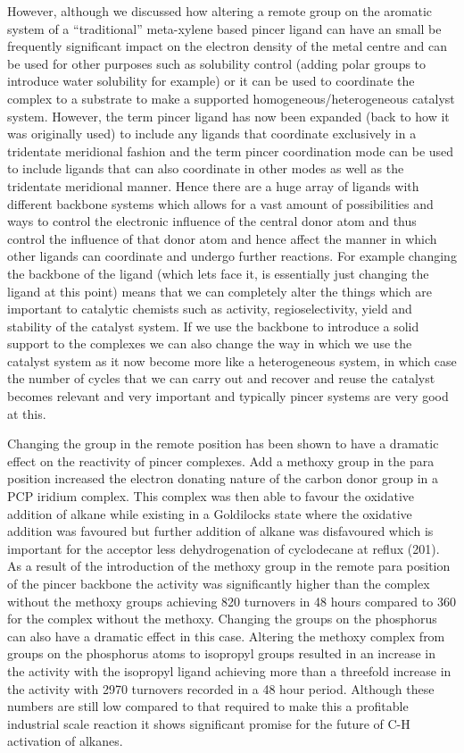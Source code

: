 However, although we discussed how altering a remote group on the aromatic system of a ``traditional'' meta-xylene based pincer ligand can have an small be frequently significant impact on the electron density of the metal centre and can be used for other purposes such as solubility control (adding polar groups to introduce water solubility for example) or it can be used to coordinate the complex to a substrate to make a supported homogeneous/heterogeneous catalyst system.  However, the term pincer ligand has now been expanded (back to how it was originally used) to include any ligands that coordinate exclusively in a tridentate meridional fashion and the term pincer coordination mode can be used to include ligands that can also coordinate in other modes as well as the tridentate meridional manner.  Hence there are a huge array of ligands with different backbone systems which allows for a vast amount of possibilities and ways to control the electronic influence of the central donor atom and thus control the \trans{} influence of that donor atom and hence affect the manner in which other ligands can coordinate and undergo further reactions.  For example changing the backbone of the ligand (which lets face it, is essentially just changing the ligand at this point) means that we can completely alter the things which are important to catalytic chemists such as activity, regioselectivity, yield and stability of the catalyst system.  If we use the backbone to introduce a solid support to the complexes we can also change the way in which we use the catalyst system as it now become more like a heterogeneous system, in which case the number of cycles that we can carry out and recover and reuse the catalyst becomes relevant and very important and typically pincer systems are very good at this.  

Changing the group in the remote position has been shown to have a dramatic effect on the reactivity of pincer complexes.  Add a methoxy group in the para position increased the electron donating nature of the carbon donor group in a PCP iridium complex.  This complex was then able to favour the oxidative addition of alkane while existing in a Goldilocks state where the oxidative addition was favoured but further addition of alkane was disfavoured which is important for the acceptor less dehydrogenation of cyclodecane at reflux (201\degrees).  As a result of the introduction of the methoxy group in the remote para position of the pincer backbone the activity was significantly higher than the complex without the methoxy groups achieving 820 turnovers in 48 hours compared to 360 for the complex without the methoxy.  Changing the groups on the phosphorus can also have a dramatic effect in this case.  Altering the methoxy complex from \tBu{} groups on the phosphorus atoms to isopropyl groups resulted in an increase in the activity with the isopropyl ligand achieving more than a threefold increase in the activity with 2970 turnovers recorded in a 48 hour period.  Although these numbers are still low compared to that required to make this a profitable industrial scale reaction  it shows significant promise for the future of C-H activation of alkanes.  

